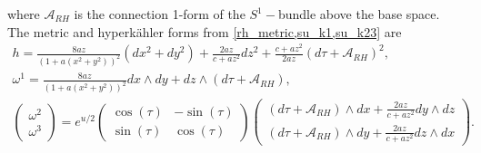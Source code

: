 \documentclass[a4paper,12pt, onecolumn, notitlepage]{article}
\theoremstyle{definition}
\theoremstyle{remark}
\newcommand{\w}{\omega}
\newcommand{\HK}{hyperk\"ahler }
\begin{document}
where $\mathcal{A}_{RH}$ is the connection 1-form of the $S^{1}-$bundle above the base space. The metric and \HK forms from \cref{rh_metric,su_k1,su_k23} are
\begin{subequations}
	\begin{gather}
	\label{su_metric}
	h = \frac{8az}{(1+a(x^{2} + y^{2}))^{2}}(dx^{2}+dy^{2}) + \frac{2az}{c+az^{2}}dz^{2} +
	\frac{c+az^{2}}{2az}(d\tau + \mathcal{A}_{RH})^{2},\\
	\label{su_kahler1}
	\w^{1} = \frac{8az}{(1+a(x^{2} + y^{2}))^{2}}dx\wedge dy + dz \wedge (d\tau + \mathcal{A}_{RH}),\\
	\label{foldrh_k2k3}
	\begin{pmatrix}
	\w^{2}\\
	\w^{3}
	\end{pmatrix}
	=
	e^{u/2}
	\begin{pmatrix}
	\cos(\tau) & -\sin(\tau) \\
	\sin(\tau) & \cos(\tau)
	\end{pmatrix}
	\begin{pmatrix}
	(d\tau + \mathcal{A}_{RH})\wedge dx + \frac{2az}{c+az^{2}}dy\wedge dz\\
	(d\tau + \mathcal{A}_{RH})\wedge dy + \frac{2az}{c+az^{2}}dz\wedge dx
	\end{pmatrix}.
	\end{gather}
\end{subequations}
\end{document}
